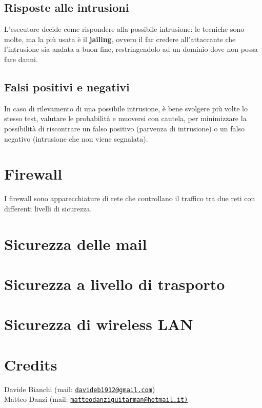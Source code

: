 \documentclass[a4paper, 11pt]{article}
\newcommand{\mail}[1]{\href{mailto:#1}{\texttt{#1}}}
\begin{document}
\begin{multicols}{2}
\subsection{Risposte alle intrusioni}
L'esecutore decide come rispondere alla possibile intrusione: le tecniche sono molte, ma la più usata è il \textbf{jailing}, ovvero il far credere all'attaccante che l'intrusione sia andata a buon fine, restringendolo ad un dominio dove non possa fare danni.

\subsection{Falsi positivi e negativi}
In caso di rilevamento di una possibile intrusione, è bene svolgere più volte lo stesso test, valutare le probabilità e muoversi con cautela, per minimizzare la possibilità di riscontrare un falso positivo (parvenza di intrusione) o un falso negativo (intrusione che non viene segnalata).
	
	\section{Firewall}
	I firewall sono apparecchiature di rete che controllano il traffico tra due reti con differenti livelli di sicurezza.
	
	
	\section{Sicurezza delle mail}
	
	\section{Sicurezza a livello di trasporto}
	
	\section{Sicurezza di wireless LAN}
		
		
		
		
		
		
	
	
	
	
	
	
	
	
	
	
	
	
	
	\end{multicols}

	\section{Credits}
	Davide Bianchi (mail: \mail{davideb1912@gmail.com}) \\
	Matteo Danzi (mail: \mail{matteodanziguitarman@hotmail.it)}
	
\end{document}
